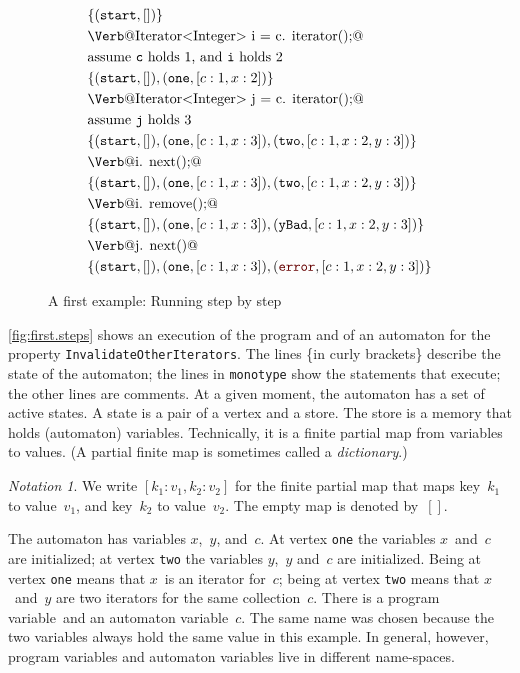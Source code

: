 \documentclass[preprint]{sigplanconf} %
\newcommand{\error}{\ensuremath{\textcolor{darkred}{\mathtt{error}}}\xspace}
\newcommand{\start}{\ensuremath{\mathtt{start}}\xspace}
\theoremstyle{definition}
\theoremstyle{remark}
\newtheorem{notation}{Notation}
\begin{document}
\begin{figure}
{\def\s#1{\text{\Verb@#1@}}
 \def\m#1{\PY{n+na}{#1}}
 \def\t#1{\mathtt{#1}}
\begin{align*}
&\{(\start,[])\} \\
&\s{Iterator<Integer> i = c.\m{iterator}();} \\
&\text{assume {\tt c} holds $1$, and {\tt i} holds $2$ } \\
&\{(\start,[]), (\t{one},[c:1,x:2])\} \\
&\s{Iterator<Integer> j = c.\m{iterator}();} \\
&\text{assume {\tt j} holds $3$} \\
&\{(\start,[]), (\t{one},[c:1,x:3]),(\t{two},[c:1,x:2,y:3])\} \\
&\s{i.\m{next}();} \\
&\{(\start,[]), (\t{one},[c:1,x:3]),(\t{two},[c:1,x:2,y:3])\} \\
&\s{i.\m{remove}();} \\
&\{(\start,[]), (\t{one},[c:1,x:3]),(\t{yBad},[c:1,x:2,y:3])\} \\
&\s{j.\m{next}()} \\
&\{(\start,[]), (\t{one},[c:1,x:3]), (\error,[c:1,x:2,y:3])\}
\end{align*}}
\caption{A first example: Running step by step}
\label{fig:first.steps}
\end{figure} %

\autoref{fig:first.steps} shows an execution of the program and of an automaton for the property \texttt{InvalidateOtherIterators}.
The lines \{in curly brackets\} describe the state of the automaton;
the lines in \texttt{monotype} show the statements that execute;
the other lines are comments.
At a given moment, the automaton has a set of active states.
A state is a pair of a vertex and a store.
The store is a memory that holds (automaton) variables.
Technically, it is a finite partial map from variables to values.
(A partial finite map is sometimes called a \emph{dictionary}.)

\begin{notation}
We write $[k_1:v_1,k_2:v_2]$ for the finite partial map that maps key~$k_1$ to value~$v_1$, and key~$k_2$ to value~$v_2$.
The empty map is denoted by~$[]$.
\end{notation}

The automaton has variables $x$,~$y$, and~$c$.
At vertex \texttt{one} the variables $x$~and~$c$ are initialized;
at vertex \texttt{two} the variables $y$,~$y$ and~$c$ are initialized.
Being at vertex \texttt{one} means that $x$~is an iterator for~$c$;
being at vertex \texttt{two} means that $x$~and~$y$ are two iterators for the same collection~$c$.
There is a program variable~\Verb@c@ and an automaton variable~$c$.
The same name was chosen because the two variables always hold the same value in this example.
In general, however, program variables and automaton variables live in different name-spaces.
\end{document}
